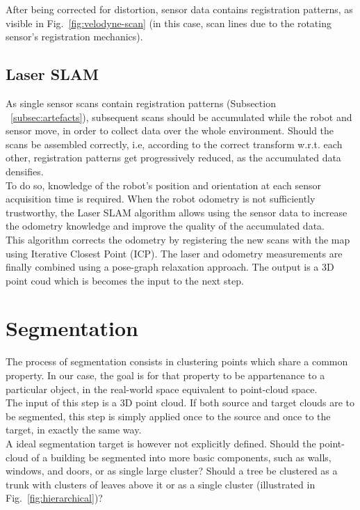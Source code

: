After being corrected for distortion, sensor data contains registration patterns, as visible in Fig.~\ref{fig:velodyne-scan} (in this case, scan lines due to the rotating sensor's registration mechanics).

\subsection{Laser SLAM}
\label{subsec:SLAM}

As single sensor scans contain registration patterns (Subsection ~\ref{subsec:artefacts}), subsequent scans should be accumulated while the robot and sensor move, in order to collect data over the whole environment. Should the scans be assembled correctly, i.e, according to the correct transform w.r.t. each other, registration patterns get progressively reduced, as the accumulated data densifies.\\

To do so, knowledge of the robot's position and orientation at each sensor acquisition time is required. When the robot odometry is not sufficiently trustworthy, the Laser SLAM algorithm allows using the sensor data to increase the odometry knowledge and improve the quality of the accumulated data.\\

This algorithm corrects the odometry by registering the new scans with the map using Iterative Closest Point (ICP). The laser and odometry measurements are finally combined using a pose-graph relaxation approach. The output is a 3D point coud which is becomes the input to the next step.

\section{Segmentation}
\label{sec:segmentation}

The process of segmentation consists in clustering points which share a common property. In our case, the goal is for that property to be appartenance to a particular object, in the real-world space equivalent to point-cloud space.\\

The input of this step is a 3D point cloud. If both source and target clouds are to be segmented, this step is simply applied once to the source and once to the target, in exactly the same way.\\

A ideal segmentation target is however not explicitly defined. Should the point-cloud of a building be segmented into more basic components, such as walls, windows, and doors, or as single large cluster? Should a tree be clustered as a trunk with clusters of leaves above it or as a single cluster (illustrated in Fig.~\ref{fig:hierarchical})?\\

